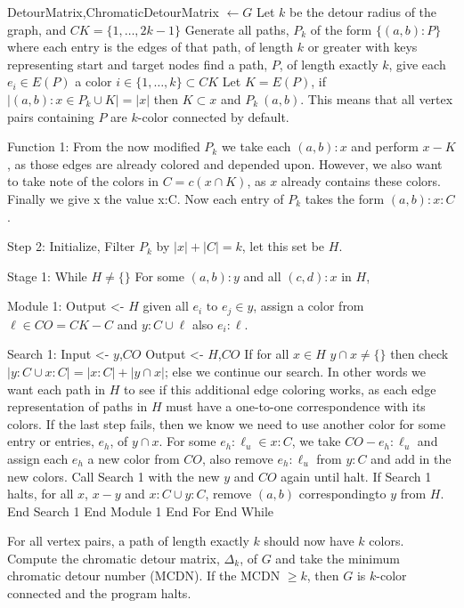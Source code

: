 \documentclass[11pt, oneside]{article}   	%
\begin{document}
\begin{algorithm}[H]
\begin{algorithmic}[1]
\Procedure{}{}
\Ensure DetourMatrix,ChromaticDetourMatrix
\Ensure  $\leftarrow G$
\State Let $k$ be the detour radius of the graph, and $CK = \{1,\dots, 2k-1\}$
Generate all paths, $P_{k}$ of the form $\{(a,b):P\}$ where each entry is the edges of that path, of length $k$ or greater with keys representing start and target nodes
find a path, $P$, of length exactly $k$, give each $e_{i}\in E(P)$ a color $i \in \{1,\dots,k\} \subset CK$
Let $K=E(P)$, if $\lvert (a,b):x\in P_{k} \cup K\rvert = \lvert x \rvert$ then $K \subset x$ and $P_{k} \ (a,b)$. This means that all vertex pairs containing $P$ are $k$-color connected by default.

Function 1:
From the now modified $P_{k}$ we take each $(a,b):x$ and perform $x - K$, as those edges are already colored and depended upon. However, we also want to take note of the colors in $C = c(x \cap K)$, as $x$ already contains these colors. Finally we give x the value x:C. Now each entry of $P_{k}$ takes the form $(a,b):x:C$.

Step 2:
Initialize,
Filter $P_{k}$ by $\lvert x \rvert + \lvert C \rvert = k$, let this set be $H$.

Stage 1:
While $H \not = \{\}$
For some $(a,b):y$ and all $(c,d):x$ in $H$,

Module 1:
Output <- $H$
given all $e_{i} \text{ to } e_{j} \in y$, assign a color from $\ell \in CO = CK - C$ and $y:C \cup \ell$ also $e_{i}:\ell$.

Search 1: Input <- $y$,$CO$
Output <- $H$,$CO$
If for all $x\in H$ $y \cap x \not = \{\}$ then check $\lvert y:C \cup x:C\rvert = \lvert x:C \rvert + \lvert y \cap x \rvert$; else we continue our search. In other words we want each path in $H$ to see if this additional edge coloring works, as each edge representation of paths in $H$ must have a one-to-one correspondence with its colors.
If the last step fails, then we know we need to use another color for some entry or entries, $e_{h}$, of $y \cap x$. For some $e_{h}:\ell_{u} \in x:C$, we take $CO - e_{h}:\ell_{u}$ and assign each $e_{h}$ a new color from $CO$, also remove $e_{h}:\ell_{u}$ from $y:C$ and add in the new colors. Call Search 1 with the new $y$ and $CO$ again until halt.
If Search 1 halts, for all $x$, $x-y$ and $x:C \cup y:C$, remove $(a,b)$ correspondingto $y$ from $H$.
End Search 1
End Module 1
End For
End While

For all vertex pairs, a path of length exactly $k$ should now have $k$ colors. Compute the chromatic detour matrix, $\Delta_{k}$, of $G$ and take the minimum chromatic detour number (MCDN). If the MCDN $\geq k$, then $G$ is $k$-color connected and the program halts.
\EndProcedure
\end{algorithmic}
\end{algorithm}
\end{document}
